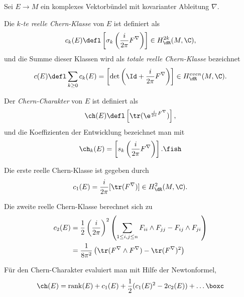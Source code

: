 \documentclass[%
	paper=a5,%
	fleqn,%
	DIV=18,%
	BCOR=0mm,
	fontsize=11pt,
	titlepage=false,%
	bibliography=totoc,
	DIV=18,%
	twoside=true,
	pdftitle=Riemannsche Geometrie,
	pdfauthor=Uwe Semmelmann,
	numbers=noendperiod]%
	{scrbook}
\begin{document}
\begin{defn}
Sei $E\to M$ ein komplexes Vektorbündel mit kovarianter Ableitung $\nabla$.
\begin{defnenum}
\item 
Die \emph{$k$-te reelle Chern-Klasse} von $E$ ist definiert als
\begin{align*}
c_k(E)\defl \left[\sigma_k\left(\frac{i}{2\pi} F^\nabla \right) \right]
\in H^{2k}_{\dR}(M,\C),
\end{align*}
und die Summe dieser Klassen wird als \emph{totale reelle Chern-Klasse}
bezeichnet
\begin{align*}
c(E) \defl \sum_{k\ge 0} c_k(E) = \left[\det\left(\Id + \frac{i}{2\pi}
F^\nabla\right) \right]\in H^{even}_{\dR}(M,\C).
\end{align*}
\item Der \emph{Chern-Charakter} von $E$ ist definiert als
\begin{align*}
\ch(E) \defl \left[\tr(\e^{\frac{i}{2\pi}F^\nabla})\right],
\end{align*}
und die Koeffizienten der Entwicklung bezeichnet man mit
\begin{align*}
\ch_k(E) = \left[s_k\left(\frac{i}{2\pi} F^\nabla\right) \right].\fish
\end{align*}
\end{defnenum}
\end{defn}

\newcommand{\rank}{\mathrm{rank}}

\begin{ex}
\begin{exenum}
\item Die erste reelle Chern-Klasse ist gegeben durch
\begin{align*}
c_1(E) = \frac{i}{2\pi}[\tr(F^\nabla)] \in H_{\dR}^2(M,\C).
\end{align*}
\item Die zweite reelle Chern-Klasse berechnet sich zu
\begin{align*}
c_2(E) &= \frac{1}{2}\left(\frac{i}{2\pi}\right)^2
\left(\sum_{1\le i,j\le n} F_{ii}\wedge F_{jj} - F_{ij} \wedge F_{ji} \right)\\
&= 
\frac{1}{8\pi^2}\left(\tr(F^\nabla\wedge F^\nabla) - \tr(F^\nabla)^2 \right)
\end{align*}
\item Für den Chern-Charakter evaluiert man mit Hilfe der Newtonformel,
\begin{align*}
\ch(E) = \rank(E) + c_1(E)  + \frac{1}{2}(c_1(E)^2 - 2c_2(E)) + \ldots\boxc
\end{align*} 
\end{exenum}
\end{ex}
\end{document}
